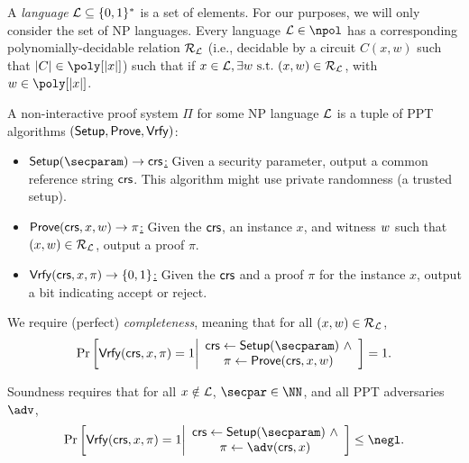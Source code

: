 A \emph{language} $\mathcal{L} \subseteq \{0,1\}^*$ is a set of elements. For our purposes, we will only consider the set of NP languages. Every language $\Lang \in \npol$ has a corresponding polynomially-decidable relation $\mathcal{R}_{\mathcal{L}}$ (i.e., decidable by a circuit $C(x,w)$ such that $\sizeof{C} \in \poly[\sizeof{x}]$) such that if $x \in \mathcal{L}, \exists w \mathrm{~s.t.~} (x,w) \in \mathcal{R}_{\mathcal{L}}$, with $w \in \poly[\sizeof{x}]$.

\begin{definition} A non-interactive proof system $\Pi$ for some NP language $\mathcal{L}$ is a tuple of PPT algorithms $(\mathsf{Setup}, \mathsf{Prove}, \mathsf{Vrfy})$:
    \begin{itemize}
        \item \underline{$\setup(\secparam) \rightarrow \crs$:} Given a security parameter, output a common reference string $\mathsf{crs}$. This algorithm might use private randomness (a trusted setup).
        \item \underline{$\mathsf{Prove}(\mathsf{crs}, x, w) \rightarrow \pi$:} Given the $\mathsf{crs}$, an instance $x$, and witness $w$ such that $(x, w) \in \mathcal{R}_{\mathcal{L}}$, output a proof $\pi$.
        \item \underline{$\mathsf{Vrfy}(\mathsf{crs}, x,\pi) \rightarrow \{0,1\}$:} Given the $\mathsf{crs}$ and a proof $\pi$ for the instance $x$, output a bit indicating accept or reject.
    \end{itemize}

We require (perfect) \emph{completeness}, meaning that for all $(x,w) \in \mathcal{R}_{\mathcal{L}}$,
\begin{equation*}
    \Pr\left[
        \vrfy(\crs, x, \pi)=1 
        \middle| 
        \begin{array}{c}
            \crs \gets \setup(\secparam)~\land\\
            \pi \gets \prove(\crs, x, \witness)
        \end{array}
    \right] = 1.
\end{equation*}
\end{definition}

\begin{definition} Soundness requires that for all $x \notin \mathcal{L}$, $\secpar \in \NN$, and all PPT adversaries $\adv$,
\begin{equation*}
    \Pr\left[
        \vrfy(\crs, x, \pi)=1 
        \middle| 
        \begin{array}{c}
            \crs \gets \setup(\secparam)~\land\\
            \pi \gets \adv(\crs, x)
        \end{array}
    \right] \leq \negl.
\end{equation*}
\end{definition}

